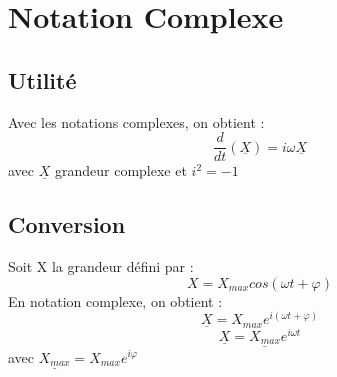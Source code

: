 \chapter{Notation Complexe}
\section{Utilité}
Avec les notations complexes, on obtient :
$$\dfrac{d}{dt}(\underline{X}) = i\omega\underline{X}$$
avec $\underline{X}$ grandeur complexe et $i^2 = -1$
\section{Conversion}
Soit X la grandeur défini par :
$$X = X_{max}cos(\omega t+\varphi)$$
En notation complexe, on obtient :
$$\underline{X} = X_{max}e^{i(\omega t+\varphi)}$$
$$\underline{X} = \underline{X_{max}}e^{i\omega t}$$
avec $\underline{X_{max}} = X_{max}e^{i\varphi}$
